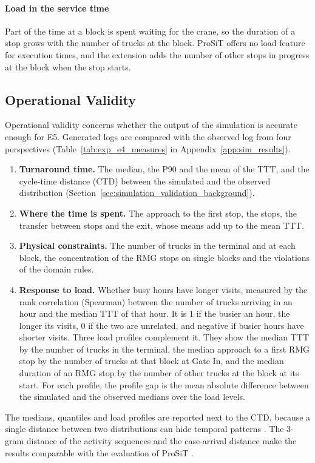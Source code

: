 \paragraph{Load in the service time} Part of the time at a block is spent waiting for
the crane, so the duration of a stop grows with the number of trucks at the block.
ProSiT offers no load feature for execution times, and the extension adds the number
of other stops in progress at the block when the stop starts.

\subsection{Operational Validity}
\label{sec:exp_e4_operational}
\label{sec:exp_e4_attribution}
\label{sec:exp_e4_runs}

Operational validity concerns whether the output of the simulation is accurate
enough for E5. Generated logs are compared with the observed log from four
perspectives (Table~\ref{tab:exp_e4_measures} in Appendix~\ref{app:sim_results}).
\begin{enumerate}[label=\textbf{P\arabic*}]
\item \textbf{Turnaround time.} The median, the P90 and the mean of the TTT, and the
cycle-time distance (CTD) between the simulated and the observed distribution
(Section~\ref{sec:simulation_validation_background}).
\item \textbf{Where the time is spent.} The approach to the first stop, the stops,
the transfer between stops and the exit, whose means add up to the mean TTT.
\item \textbf{Physical constraints.} The number of trucks in the terminal and at each
block, the concentration of the RMG stops on single blocks and the violations of the
domain rules.
\item \textbf{Response to load.} Whether busy hours have longer visits, measured by
the rank correlation (Spearman) between the number of trucks arriving in an hour and
the median TTT of that hour. It is 1 if the busier an hour, the longer its visits, 0
if the two are unrelated, and negative if busier hours have shorter visits. Three
load profiles complement it. They show the median TTT by the number of trucks in the
terminal, the median approach to a first RMG stop by the number of trucks at that
block at Gate In, and the median duration of an RMG stop by the number of other
trucks at the block at its start. For each profile, the profile gap is the mean
absolute difference between the simulated and the observed medians over the load
levels.
\end{enumerate}
The medians, quantiles and load profiles are reported next to the CTD, because a
single distance between two distributions can hide temporal patterns
\cite{Oezdemir2025RethinkingBPS}. The 3-gram distance of the activity sequences and
the case-arrival distance make the results comparable with the evaluation of ProSiT
\cite{Vinci2026prosit}.

